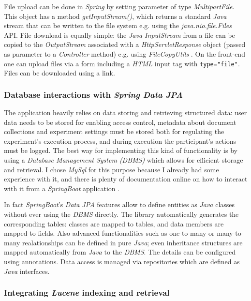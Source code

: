 \documentclass[a4paper]{usiinfbachelorproject}
\begin{document}
File upload can be done in \emph{Spring} by setting parameter of type \emph{MultipartFile}. This object has a method
\emph{getInputStream()}, which returns a standard \emph{Java} stream that can be written to the file system e.g. using
the \emph{java.nio.file.Files} API. File download is equally simple: the \emph{Java InputStream} from a file can be copied to
the \emph{OutputStream} associated with a \emph{HttpServletResponse} object (passed as parameter to a \emph{Controller} method)
e.g. using \emph{FileCopyUtils} \cite{springFileUpload}. On the front-end one can upload files via a form including a
\emph{HTML} input tag with \texttt{type="file"}. Files can be downloaded using a link.

\subsubsection{\textbf{Database interactions with \emph{Spring Data JPA}}}

The application heavily relies on data storing and retrieving structured data: user data
needs to be stored for enabling access control, metadata about document collections and experiment settings
must be stored both for regulating the experiment's execution process, and during execution the participant's
actions must be logged. The best way for implementing this kind of functionality is by using a
\emph{Database Management System (DBMS)} which allows for efficient storage and retrieval.
I chose \emph{MySql} for this purpose because I already had some experience with it, and there is plenty of documentation online on how to 
interact with it from a \emph{SpringBoot} application \cite{springJpaReference} \cite{springJpaTutorial}.

In fact \emph{SpringBoot}'s \emph{Data JPA} features allow to define entities as \emph{Java} classes without ever using the \emph{DBMS} directly.
The library automatically generates the corresponding tables: classes are mapped to tables, and data members are mapped to fields. Also advanced functionalities such as one-to-many or many-to-many realationships
can be defined in pure \emph{Java}; even inheritance structures are mapped automatically from \emph{Java} to the \emph{DBMS}. The
details can be configured using annotations.
Data access is managed via repositories which are defined as \emph{Java} interfaces.

\subsubsection{\textbf{Integrating \emph{Lucene} indexing and retrieval}}
\end{document}
